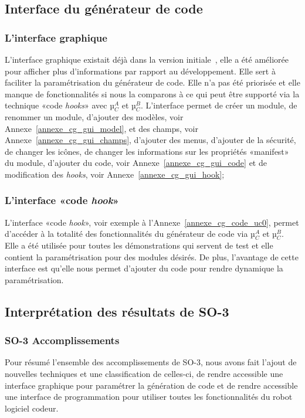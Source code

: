 \subsection{Interface du générateur de code}

\subsubsection{L'interface graphique}

 L'interface graphique existait déjà dans la version initiale~\cite{bluiksnot_repo}, elle a été améliorée pour afficher plus d'informations par rapport au développement. Elle sert à faciliter la paramétrisation du générateur de code. Elle n’a pas été priorisée et elle manque de fonctionnalités si nous la comparons à ce qui peut être supporté via la technique «code \textit{hooks}» avec µ$_C^A$ et µ$_C^B$. L'interface permet de créer un module, de renommer un module, d'ajouter des modèles, voir Annexe~\ref{annexe_cg_gui_model}, et des champs, voir Annexe~\ref{annexe_cg_gui_champs}, d'ajouter des menus, d'ajouter de la sécurité, de changer les icônes, de changer les informations sur les propriétés «manifest» du module, d'ajouter du code, voir Annexe~\ref{annexe_cg_gui_code} et de modification des \textit{hooks}, voir Annexe~\ref{annexe_cg_gui_hook};

\subsubsection{L'interface «code \textit{hook}»}

L'interface «code \textit{hook}», voir exemple à l'Annexe~\ref{annexe_cg_code_uc0}, permet d’accéder à la totalité des fonctionnalités du générateur de code via µ$_C^A$ et µ$_C^B$. Elle a été utilisée pour toutes les démonstrations qui servent de test et elle contient la paramétrisation pour des modules désirés. De plus, l'avantage de cette interface est qu'elle nous permet d'ajouter du code pour rendre dynamique la paramétrisation.

\subsection{Interprétation des résultats de SO-3}

\subsubsection{SO-3 Accomplissements}
Pour résumé l'ensemble des accomplissements de SO-3, nous avons fait l'ajout de nouvelles techniques et une classification de celles-ci, de rendre accessible une interface graphique pour paramétrer la génération de code et de rendre accessible une interface de programmation pour utiliser toutes les fonctionnalités du robot logiciel codeur.

